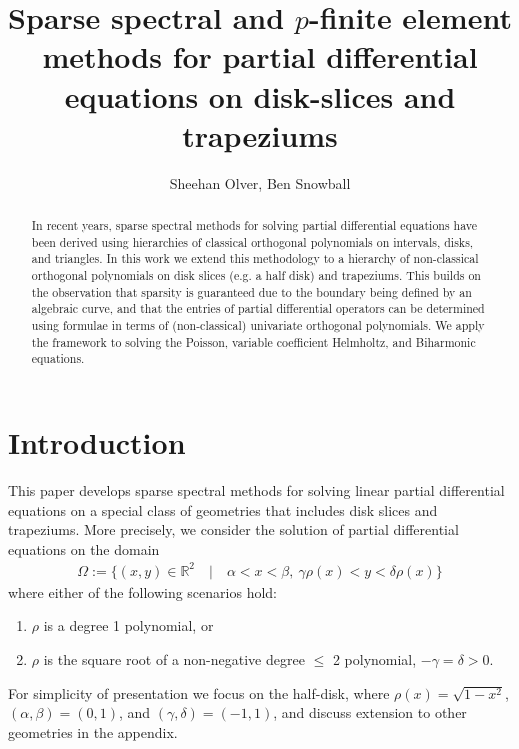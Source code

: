 \documentclass[11pt, oneside]{article}   	%
\title{Sparse spectral and $p$-finite element methods for partial differential equations on disk-slices and trapeziums}
\author{Sheehan Olver, Ben Snowball}
\newcommand{\R}{\mathbb{R}}
\begin{document}
\maketitle

\begin{abstract}
In recent years, sparse spectral methods for solving partial differential equations have been derived using hierarchies of classical orthogonal polynomials on intervals, disks, and triangles. In this work we extend this methodology to a hierarchy of non-classical orthogonal polynomials on disk slices (e.g. a half disk) and trapeziums. This builds on the observation that sparsity is guaranteed due to the boundary being defined by an algebraic curve, and that the entries of partial differential operators can be determined using formulae in terms of (non-classical) univariate orthogonal polynomials.  We apply the framework to solving the Poisson, variable coefficient Helmholtz, and Biharmonic equations.
 \end{abstract}


%
\section{Introduction}

This paper develops sparse spectral methods for solving linear partial differential equations on a special class of geometries that includes disk slices and trapeziums.  
More precisely, we consider the solution of partial differential equations on the domain
\begin{align*}
	\Omega := \{(x,y) \in \R^2 \quad | \quad \alpha < x < \beta, \: \gamma \rho(x) < y < \delta \rho(x)\}
\end{align*}
where  either of the following scenarios hold:
\begin{enumerate}
\item  \(\rho\) is a degree 1 polynomial, or 
\item \(\rho\) is the square root of a non-negative degree \(\le\) 2 polynomial, \(-\gamma = \delta > 0\).
\end{enumerate}

For simplicity of presentation we focus on the half-disk, where $\rho(x) = \sqrt{1-x^2}$,  $(\alpha,\beta) = (0, 1)$, and  $(\gamma, \delta)  = (-1,1)$, and discuss extension to other geometries in the appendix. 
\end{document}
